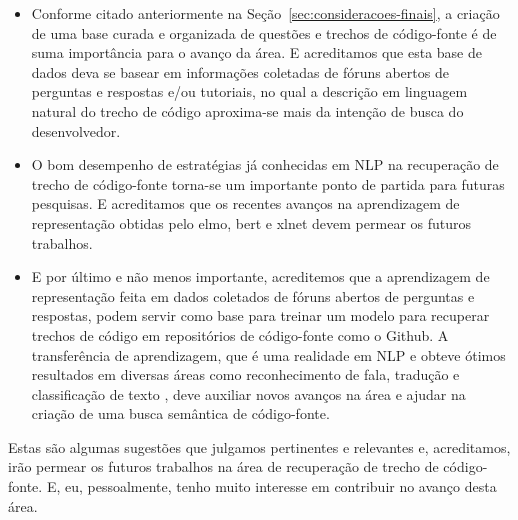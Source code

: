 \begin{itemize}
    \item Conforme citado anteriormente na Seção~\ref{sec:consideracoes-finais}, a criação de uma base curada e organizada de questões e trechos de código-fonte é de suma importância para o avanço da área. E acreditamos que esta base de dados deva se basear em informações coletadas de fóruns abertos de perguntas e respostas e/ou tutoriais, no qual a descrição em linguagem natural do trecho de código aproxima-se mais da intenção de busca do desenvolvedor.
    \item O bom desempenho de estratégias já conhecidas em NLP na recuperação de trecho de código-fonte torna-se um importante ponto de partida para futuras pesquisas. E acreditamos que os recentes avanços na aprendizagem de representação obtidas pelo \acrshort{elmo}, \acrshort{bert} e \Gls{xlnet} devem permear os futuros trabalhos. 
    \item E por último e não menos importante, acreditemos que a aprendizagem de representação feita em dados coletados de fóruns abertos de perguntas e respostas, podem servir como base para treinar um modelo para recuperar trechos de código em repositórios de código-fonte como o Github. A transferência de aprendizagem, que é uma realidade em NLP e obteve ótimos resultados em diversas áreas como reconhecimento de fala, tradução e classificação de texto \cite{devlin-etal-2019-bert}, deve auxiliar novos avanços na área e ajudar na criação de uma busca semântica de código-fonte.
\end{itemize}

Estas são algumas sugestões que julgamos pertinentes e relevantes e, acreditamos, irão permear os futuros trabalhos na área de recuperação de trecho de código-fonte. E, eu, pessoalmente, tenho muito interesse em contribuir no avanço desta área.